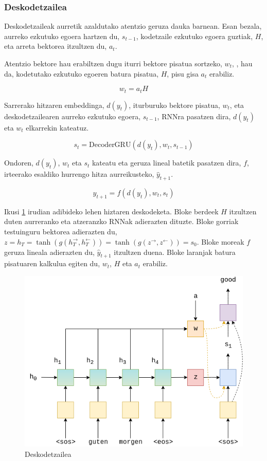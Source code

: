 \documentclass[11pt,a4paper]{article}
\begin{document}
\subsubsection{Deskodetzailea}
Deskodetzaileak aurretik azaldutako atentzio geruza dauka barnean. Esan bezala, aurreko ezkutuko egoera hartzen du, $s_{t-1}$, kodetzaile ezkutuko egoera guztiak, $H$, eta arreta bektorea itzultzen du, $a_t$.

Atentzio bektore hau erabiltzen dugu iturri bektore pisatua sortzeko, $w_t$, , hau da, kodetutako ezkutuko egoeren batura pisatua, $H$, pisu gisa $a_t$ erabiliz.

$$w_t = a_t H$$

Sarrerako hitzaren embeddinga, $d(y_t)$, iturburuko bektore pisatua, $w_t$, eta deskodetzailearen aurreko ezkutuko egoera, $s_{t-1}$, RNNra pasatzen dira, $d(y_t)$ eta $w_t$ elkarrekin kateatuz.

$$s_t = \text{DecoderGRU}(d(y_t), w_t, s_{t-1})$$

Ondoren, $d(y_t)$, $w_t$ eta $s_t$ kateatu eta geruza lineal batetik pasatzen dira, $f$, irteerako esaldiko hurrengo hitza aurreikusteko, $\hat{y}_{t+1}$.

$$\hat{y}_{t+1} = f(d(y_t), w_t, s_t)$$

Ikusi \ref{fig:decoder} irudian adibideko lehen hiztaren deskodeketa. Bloke berdeek $H$ itzultzen duten aurreranko eta atzeranzko RNNak adierazten dituzte. Bloke gorriak testuinguru bektorea adierazten du, $z = h_T = \tanh(g(h^\rightarrow_T,h^\leftarrow_T)) = \tanh(g(z^\rightarrow, z^\leftarrow)) = s_0$. Bloke moreak $f$ geruza lineala adierazten du, $\hat{y}_{t+1}$ itzultzen duena. Bloke laranjak batura pisatuaren kalkulua egiten du, $w_t$, $H$ eta $a_t$ erabiliz.

\begin{figure}[ht]
    \centering
    \includegraphics[width=\linewidth]{decoder}
    \caption{Deskodetzailea}
    \label{fig:decoder}
\end{figure}
\end{document}
